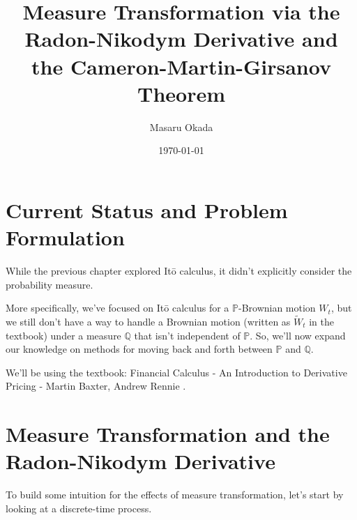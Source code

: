 \documentclass[uplatex,a4j,12pt,dvipdfmx]{jsarticle}
\title{
Measure Transformation via the Radon-Nikodym Derivative and the Cameron-Martin-Girsanov Theorem
}
\author{Masaru Okada
}
\date{ \today }
\begin{document}
\maketitle

\tableofcontents

\section{Current Status and Problem Formulation}

While the previous chapter explored It\=o calculus, it didn't explicitly consider the probability measure.

More specifically, we've focused on It\=o calculus for a $\mathbb{P}$-Brownian motion $W_{t}$, but we still don't have a way to handle a Brownian motion (written as $\tilde{W}_{t}$ in the textbook) under a measure $\mathbb{Q}$ that isn't independent of $\mathbb{P}$. So, we'll now expand our knowledge on methods for moving back and forth between $\mathbb{P}$ and $\mathbb{Q}$.

We'll be using the textbook:
Financial Calculus - An Introduction to Derivative Pricing - Martin Baxter, Andrew Rennie
\cite{BaxterRennie}.

\section{Measure Transformation and the Radon-Nikodym Derivative}

To build some intuition for the effects of measure transformation, let's start by looking at a discrete-time process.
\end{document}
